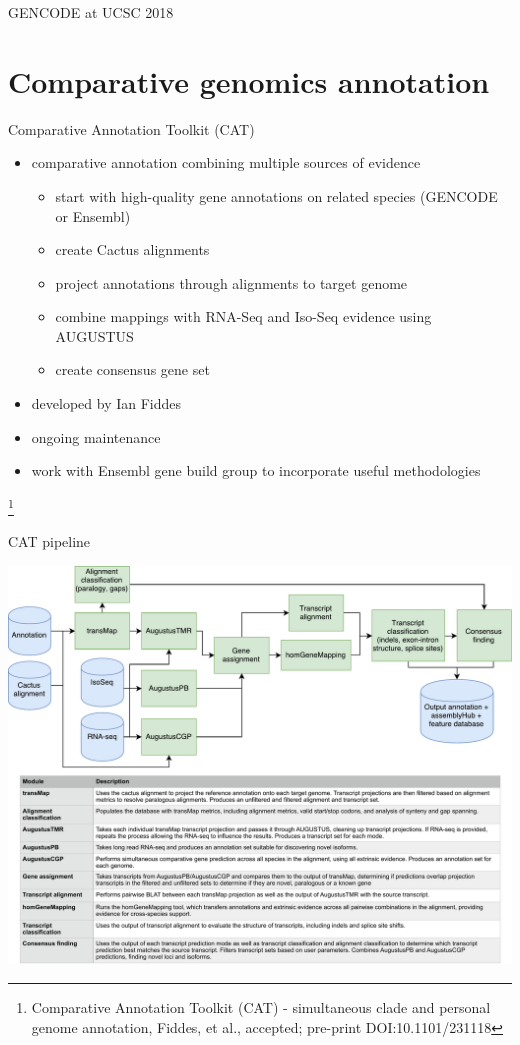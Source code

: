 \documentclass[10pt,
               hyperref={bookmarks=false,
                         bookmarksopen=false,
                         colorlinks=true,
                         linkcolor=blue,
                         urlcolor=blue},
               xcolor={svgnames,table}]{beamer}
\newcommand{\sectionframe}[1]{
  \begin{frame}{\thetitle}
    \section{#1}
  \end{frame}
}
\newcommand\blfootnote[1]{%
  \begingroup
  \renewcommand\thefootnote{}\footnote{#1}%
  \addtocounter{footnote}{-1}%
  \endgroup
}
\newenvironment{tightitemize}{%
\begin{itemize}
  \setlength{\itemsep}{1pt}%
  \setlength{\parskip}{0pt}%
  \setlength{\parsep}{0pt}%
}{\end{itemize}}
\newcommand{\thetitle}{GENCODE at UCSC 2018}
\begin{document}
\sectionframe{Comparative genomics annotation}

\begin{frame}{Comparative Annotation Toolkit (CAT)}
  \begin{itemize}
  \item comparative annotation combining multiple sources of evidence
    \begin{tightitemize}
    \item start with high-quality gene annotations on related species (GENCODE or Ensembl)
    \item create Cactus alignments
    \item project annotations through alignments to target genome
    \item combine mappings with RNA-Seq and Iso-Seq evidence using AUGUSTUS
    \item create consensus gene set 
    \end{tightitemize}
  \item developed by Ian Fiddes
  \item ongoing maintenance 
  \item work with Ensembl gene build group to incorporate useful methodologies
  \end{itemize}
\blfootnote{Comparative Annotation Toolkit (CAT) - simultaneous clade and personal genome annotation, Fiddes, et al., accepted; pre-print DOI:10.1101/231118}
\end{frame}

\begin{frame}{CAT pipeline}
  \begin{center}
    \includegraphics[scale=0.38]{images/CAT_pipeline.pdf}
  \end{center}
\end{frame}
\end{document}
